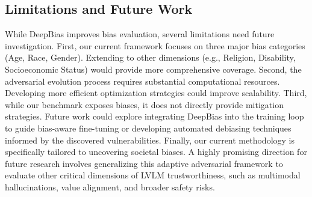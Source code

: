 \documentclass[lettersize,journal]{IEEEtran}
\begin{document}
\subsection{Limitations and Future Work}
While DeepBias improves bias evaluation, several limitations need future investigation.
First, our current framework focuses on three major bias categories (Age, Race, Gender). Extending to other dimensions (e.g., Religion, Disability, Socioeconomic Status) would provide more comprehensive coverage.
Second, the adversarial evolution process requires substantial computational resources. Developing more efficient optimization strategies could improve scalability.
Third, while our benchmark exposes biases, it does not directly provide mitigation strategies. Future work could explore integrating DeepBias into the training loop to guide bias-aware fine-tuning or developing automated debiasing techniques informed by the discovered vulnerabilities.
Finally, our current methodology is specifically tailored to uncovering societal biases. A highly promising direction for future research involves generalizing this adaptive adversarial framework to evaluate other critical dimensions of LVLM trustworthiness, such as multimodal hallucinations, value alignment, and broader safety risks.
\end{document}
